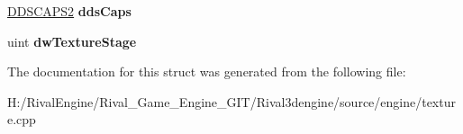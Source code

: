 \begin{DoxyCompactItemize}
\begin{tabbing}
\end{tabbing}\item 
\mbox{\label{struct_d_d_s_u_r_f_a_c_e_d_e_s_c2_add6306ce126a7a97679376651e7c3587}} 
\hyperlink{struct_d_d_s_c_a_p_s2}{D\+D\+S\+C\+A\+P\+S2} {\bfseries dds\+Caps}
\item 
\mbox{\label{struct_d_d_s_u_r_f_a_c_e_d_e_s_c2_ae1b360c27dccdc46d38b2b124dec2f09}} 
uint {\bfseries dw\+Texture\+Stage}
\end{DoxyCompactItemize}


The documentation for this struct was generated from the following file\+:\begin{DoxyCompactItemize}
\item 
H\+:/\+Rival\+Engine/\+Rival\+\_\+\+Game\+\_\+\+Engine\+\_\+\+G\+I\+T/\+Rival3dengine/source/engine/texture.\+cpp\end{DoxyCompactItemize}
